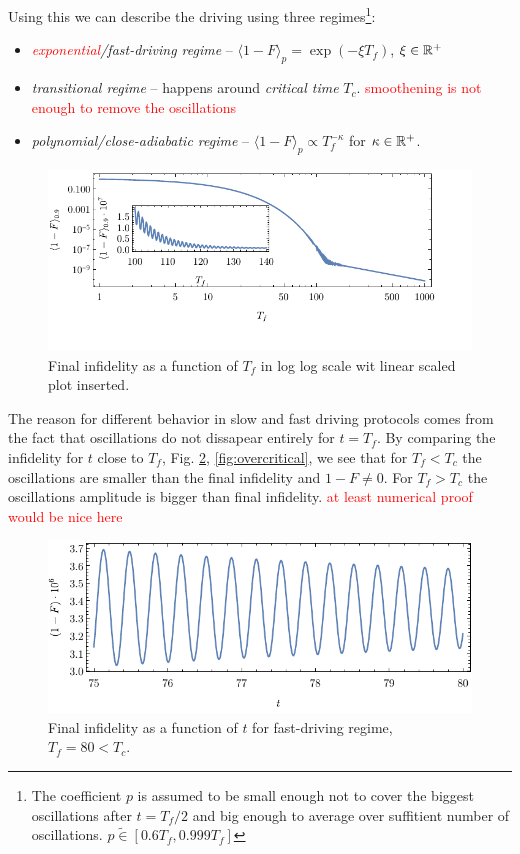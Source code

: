 Using this we can describe the driving using three regimes\footnote{The coefficient $p$ is assumed to be small enough not to cover the biggest oscillations after $t=T_f/2$ and big enough to average over suffitient number of oscillations. $p\tilde\in[0.6T_f,0.999T_f]$}:
\begin{itemize}
    \item \emph{\textcolor{red}{exponential}/fast-driving regime} -- $\langle 1-F\rangle_p= \exp(-\xi T_f)$, $\xi\in\mathbb{R}^+$
    \item \emph{transitional regime} -- happens around \emph{critical time} $T_c$. \textcolor{red}{smoothening is not enough to remove the oscillations}
    \item \emph{polynomial/close-adiabatic regime} -- $\langle 1-F\rangle_p\propto T_f^{-\kappa}$ for $\kappa\in \mathbb{R}^+$.
\end{itemize}

\begin{figure}[H]
    \centering
    \includegraphics[scale=1.2]{../img/infidCombined1.pdf}
    \caption{Final infidelity as a function of $T_f$ in log log scale wit linear scaled plot inserted.}
    \label{fig:infidCombined}
\end{figure}


The reason for different behavior in slow and fast driving protocols comes from the fact that oscillations do not dissapear entirely for $t=T_f$. By comparing the infidelity for $t$ close to $T_f$, Fig. \ref{fig:undercritical}, \ref{fig:overcritical}, we see that for $T_f<T_c$ the oscillations are smaller than the final infidelity and $1-F\neq 0$. For $T_f>T_c$ the oscillations amplitude is bigger than final infidelity. \textcolor{red}{at least numerical proof would be nice here}

\begin{figure}[H]
    \centering
    \includegraphics[scale=1.2]{../img/undercritical.pdf}
    \caption{Final infidelity as a function of $t$ for fast-driving regime, $T_f=80<T_c$.}
    \label{fig:undercritical}
\end{figure}

